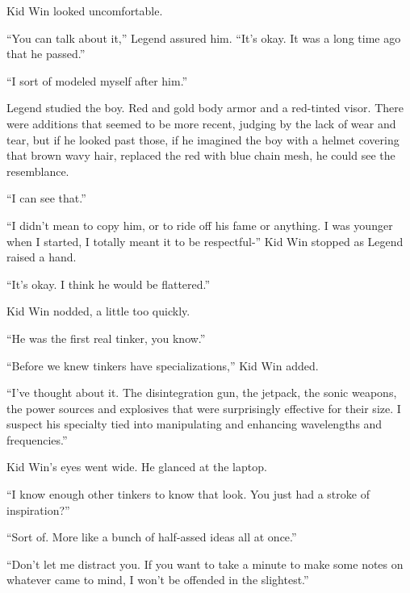 Kid Win looked uncomfortable.



``You can talk about it,'' Legend assured him.  ``It's okay.  It was a long time ago that he passed.''



``I sort of modeled myself after him.''



Legend studied the boy.  Red and gold body armor and a red-tinted visor.  There were additions that seemed to be more recent, judging by the lack of wear and tear, but if he looked past those, if he imagined the boy with a helmet covering that brown wavy hair, replaced the red with blue chain mesh, he could see the resemblance.



``I can see that.''



``I didn't mean to copy him, or to ride off his fame or anything.  I was younger when I started, I totally meant it to be respectful-''  Kid Win stopped as Legend raised a hand.



``It's okay.  I think he would be flattered.''



Kid Win nodded, a little too quickly.



``He was the first real tinker, you know.''



``Before we knew tinkers have specializations,'' Kid Win added.



``I've thought about it.  The disintegration gun, the jetpack, the sonic weapons, the power sources and explosives that were surprisingly effective for their size.  I suspect his specialty tied into manipulating and enhancing wavelengths and frequencies.''



Kid Win's eyes went wide.  He glanced at the laptop.



``I know enough other tinkers to know that look.  You just had a stroke of inspiration?''



``Sort of.  More like a bunch of half-assed ideas all at once.''



``Don't let me distract you.  If you want to take a minute to make some notes on whatever came to mind, I won't be offended in the slightest.''



